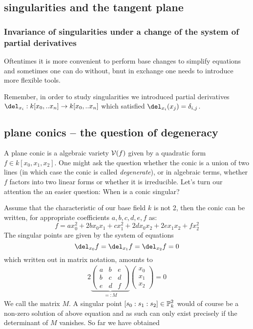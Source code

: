 \subsection{singularities and the tangent plane}



\subsubsection{Invariance of singularities under a change of the system of partial derivatives}

Oftentimes it is more convenient to perform base changes to simplify equations and sometimes one can do without, bnut in exchange one needs to introduce more flexible tools.

Remember, in order to study singularities we introduced partial derivatives $\del_{x_i} : k[x_0,..x_n] \to k[x_0,..x_n]$ which satisfied $\del_{x_i}(x_j) = \delta_{i,j}$.



\subsection{plane conics -- the question of degeneracy}

A plane conic is a algebraic variety $\operatorname{\mathcal V}(f)$ given by a quadratic form $f \in k[x_0,x_1,x_2]$. One might ask the question whether the conic is a union of two lines (in which case the conic is called \emph{degenerate}), or in algebraic terms, whether $f$ factors into two linear forms or whether it is irreducible.
Let's turn our attention the an easier question: When is a conic singular?

Assume that the characteristic of our base field $k$ is not 2, then the conic can be written, for appropriate coefficients $a,b,c,d,e,f$ as:
\begin{equation}
f = ax_0^2 + 2bx_0x_1 + cx_1^2 + 2dx_0x_2 + 2ex_1x_2 + fx_2^2
\end{equation}
The singular points are given by the system of equations
\begin{equation}
\del_{x_0} f = \del_{x_1} f = \del_{x_2} f = 0
\end{equation}
which written out in matrix notation, amounts to
\begin{align}
2
\underset{=:M}{\underbrace{
\begin{pmatrix}
a & b & e \\
b & c & d \\
e & d & f
\end{pmatrix}
}}
\begin{pmatrix}
x_0 \\ x_1 \\ x_2
\end{pmatrix}
=
0
\end{align}
We call the matrix $M$.
A singular point $[s_0:s_1:s_2] \in \operatorname{\mathbb P}^2_k$ would of course be a non-zero solution of above equation and as such can only exist precisely if the determinant of $M$ vanishes.
So far we have obtained


